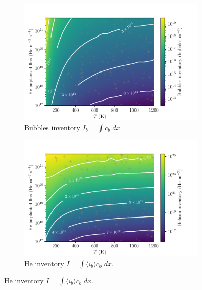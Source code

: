 \begin{figure} [ht!]
    \centering
    \begin{subfigure}{0.5\linewidth}
        \centering
        \includegraphics[width=\linewidth]{Figures/Chapter4/parametric study/bubbles_total_T_phi.pdf}
        \caption{Bubbles inventory $I_b = \int c_b \; dx$.}
    \end{subfigure}%
    \begin{subfigure}{0.5\linewidth}
        \centering
        \includegraphics[width=\linewidth]{Figures/Chapter4/parametric study/inventory_T_phi.pdf}
        \caption{He inventory $I = \int \langle i_b \rangle c_b \; dx$.}
    \end{subfigure}

\end{figure}
